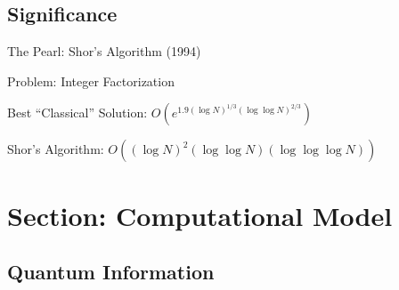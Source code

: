 \documentclass[
handout,
ignorenonframetext,hyperref={pdftex,unicode},xcolor=dvipsnames]{beamer}
\begin{document}
\subsection{Significance}

\begin{frame}{The Pearl: Shor's Algorithm (1994)}

  \vspace{5mm}
  Problem: Integer Factorization

  \vspace{5mm}
  Best ``Classical'' Solution:
    $ O \! \left( e^{1.9 (\log N)^{1/3} (\log \log N)^{2/3}} \right)$
    
  \vspace{5mm}
  Shor's Algorithm:
    $O \! \left( (\log N)^{2} (\log \log N) (\log \log \log N) \right)$

\end{frame}


\section{Section: Computational Model}

\subsection{Quantum Information}
\end{document}
